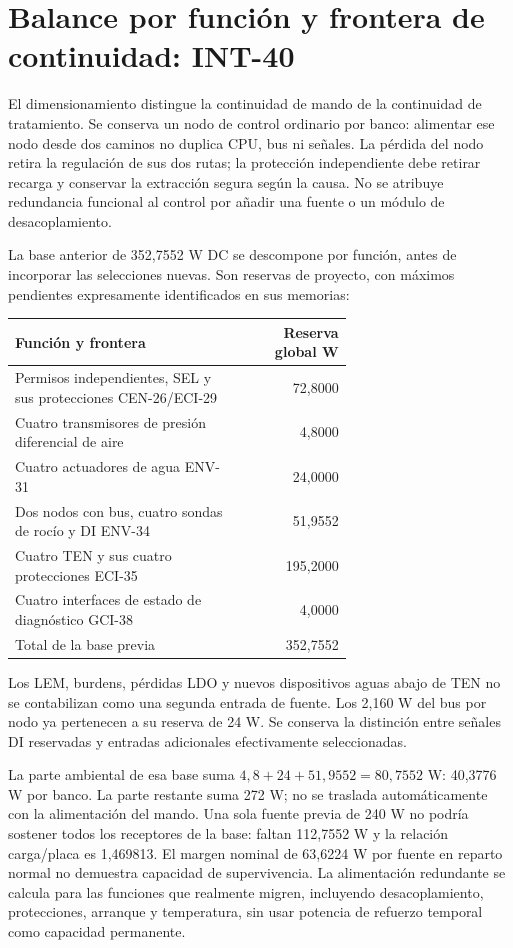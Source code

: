 \section{Balance por función y frontera de continuidad: INT-40}
\label{sec:sd4-continuidad-int40}
El dimensionamiento distingue la continuidad de mando de la continuidad de tratamiento. Se conserva un nodo de control ordinario por banco: alimentar ese nodo desde dos caminos no duplica CPU, bus ni señales. La pérdida del nodo retira la regulación de sus dos rutas; la protección independiente debe retirar recarga y conservar la extracción segura según la causa. No se atribuye redundancia funcional al control por añadir una fuente o un módulo de desacoplamiento.

La base anterior de 352,7552 W DC se descompone por función, antes de incorporar las selecciones nuevas. Son reservas de proyecto, con máximos pendientes expresamente identificados en sus memorias:
\begin{center}
\begin{tabular}{p{0.67\linewidth}r}
\hline
Función y frontera & Reserva global W \\
\hline
Permisos independientes, SEL y sus protecciones CEN-26/ECI-29 & 72,8000 \\
Cuatro transmisores de presión diferencial de aire & 4,8000 \\
Cuatro actuadores de agua ENV-31 & 24,0000 \\
Dos nodos con bus, cuatro sondas de rocío y DI ENV-34 & 51,9552 \\
Cuatro TEN y sus cuatro protecciones ECI-35 & 195,2000 \\
Cuatro interfaces de estado de diagnóstico GCI-38 & 4,0000 \\
\hline
Total de la base previa & 352,7552 \\
\hline
\end{tabular}
\end{center}
Los LEM, burdens, pérdidas LDO y nuevos dispositivos aguas abajo de TEN no se contabilizan como una segunda entrada de fuente. Los 2,160 W del bus por nodo ya pertenecen a su reserva de 24 W. Se conserva la distinción entre señales DI reservadas y entradas adicionales efectivamente seleccionadas.

La parte ambiental de esa base suma $4,8+24+51,9552=80,7552$ W: 40,3776 W por banco. La parte restante suma 272 W; no se traslada automáticamente con la alimentación del mando. Una sola fuente previa de 240 W no podría sostener todos los receptores de la base: faltan 112,7552 W y la relación carga/placa es 1,469813. El margen nominal de 63,6224 W por fuente en reparto normal no demuestra capacidad de supervivencia. La alimentación redundante se calcula para las funciones que realmente migren, incluyendo desacoplamiento, protecciones, arranque y temperatura, sin usar potencia de refuerzo temporal como capacidad permanente.

